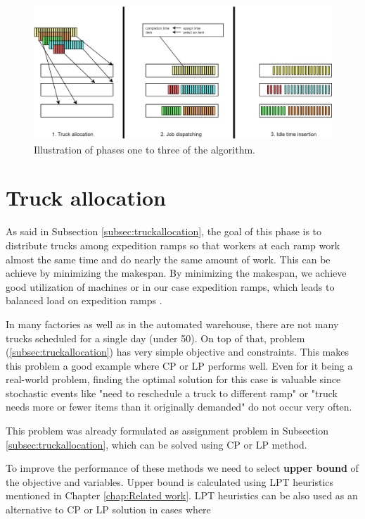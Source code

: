 \documentclass{ctuthesis}
\begin{document}
\begin{figure}[h]
\includegraphics[width=1.0\linewidth]{algo.jpg}
\caption{Illustration of phases one to three of the algorithm.}
\end{figure}

\section{Truck allocation}

As said in Subsection \ref{subsec:truckallocation}, the goal of this phase is to distribute trucks among expedition ramps so that workers at each ramp work almost the same time and do nearly the same amount of work. This can be achieve by minimizing the makespan. By minimizing the makespan, we achieve good utilization of machines or in our case expedition ramps, which leads to balanced load on expedition ramps \cite{pinedo}. 

In many factories as well as in the automated warehouse, there are not many trucks scheduled for a single day (under 50). On top of that,  problem (\ref{subsec:truckallocation}) has very simple objective and constraints. This makes this problem a good example where CP or LP performs well. Even for it being a real-world problem, finding the optimal solution for this case is valuable since stochastic events like "need to reschedule a truck to different ramp" or "truck needs more or fewer items than it originally demanded" do not occur very often.

This problem was already formulated as assignment problem in Subsection \ref{subsec:truckallocation}, which can be solved using CP or LP method.

To improve the performance of these methods we need to select \textbf{upper bound} of the objective and variables. Upper bound is calculated using LPT heuristics mentioned in Chapter \ref{chap:Related work}. LPT heuristics can be also used as an alternative to CP or LP solution in cases where 
\end{document}

